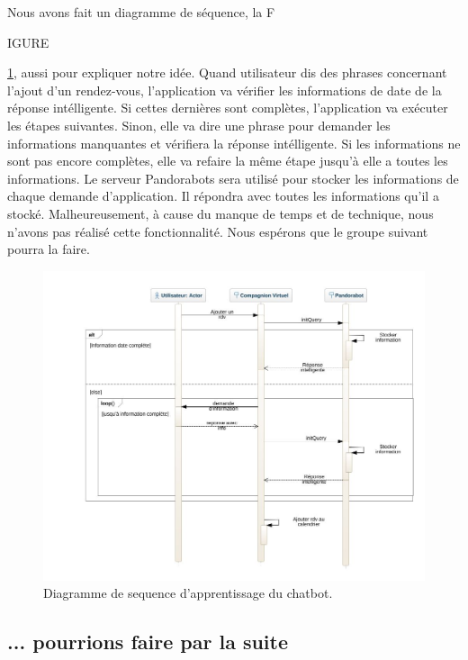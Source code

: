 \indent Nous avons fait un diagramme de séquence, la F\begin{footnotesize}IGURE\end{footnotesize} \ref{fig4}, aussi pour expliquer notre idée. Quand utilisateur dis des phrases concernant l'ajout d'un rendez-vous, l'application va vérifier les informations de date de la réponse intélligente. Si cettes dernières sont complètes, l'application va exécuter les étapes suivantes. Sinon, elle va dire une phrase pour demander les informations manquantes et vérifiera la réponse intélligente. Si les informations ne sont pas encore complètes, elle va refaire la même étape jusqu'à elle a toutes les informations. Le serveur Pandorabots sera utilisé pour stocker les informations de chaque demande d'application. Il répondra avec toutes les informations qu'il a stocké. Malheureusement, à cause du manque de temps et de technique, nous n'avons pas réalisé cette fonctionnalité. Nous espérons que le groupe suivant pourra la faire. 

\begin{figure}[ht]
\centering
\includegraphics[width=1\linewidth]{./diagrammes/SequenceDiagram_multi_conversation.jpeg}
\caption{Diagramme de sequence d'apprentissage du chatbot.\label{fig4}}
\end{figure}

\subsection{... pourrions faire par la suite}


